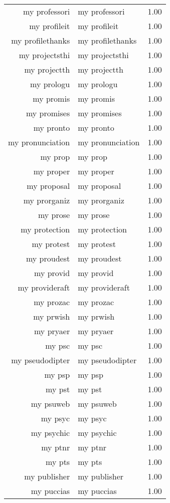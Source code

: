 \begin{table}[ht]
\begin{tabular}{rlr}
  my professori & my professori & 1.00 \\ 
  my profileit & my profileit & 1.00 \\ 
  my profilethanks & my profilethanks & 1.00 \\ 
  my projectsthi & my projectsthi & 1.00 \\ 
  my projectth & my projectth & 1.00 \\ 
  my prologu & my prologu & 1.00 \\ 
  my promis & my promis & 1.00 \\ 
  my promises & my promises & 1.00 \\ 
  my pronto & my pronto & 1.00 \\ 
  my pronunciation & my pronunciation & 1.00 \\ 
  my prop & my prop & 1.00 \\ 
  my proper & my proper & 1.00 \\ 
  my proposal & my proposal & 1.00 \\ 
  my prorganiz & my prorganiz & 1.00 \\ 
  my prose & my prose & 1.00 \\ 
  my protection & my protection & 1.00 \\ 
  my protest & my protest & 1.00 \\ 
  my proudest & my proudest & 1.00 \\ 
  my provid & my provid & 1.00 \\ 
  my provideraft & my provideraft & 1.00 \\ 
  my prozac & my prozac & 1.00 \\ 
  my prwish & my prwish & 1.00 \\ 
  my pryaer & my pryaer & 1.00 \\ 
  my psc & my psc & 1.00 \\ 
  my pseudodipter & my pseudodipter & 1.00 \\ 
  my psp & my psp & 1.00 \\ 
  my pst & my pst & 1.00 \\ 
  my psuweb & my psuweb & 1.00 \\ 
  my psyc & my psyc & 1.00 \\ 
  my psychic & my psychic & 1.00 \\ 
  my ptnr & my ptnr & 1.00 \\ 
  my pts & my pts & 1.00 \\ 
  my publisher & my publisher & 1.00 \\ 
  my puccias & my puccias & 1.00 \\ 

\end{tabular}
\end{table}

